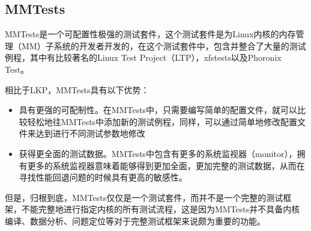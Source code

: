 \subsection{MMTests}

MMTests是一个可配置性极强的测试套件，这个测试套件是为Linux内核的内存管理（MM）子系统的开发者开发的，在这个测试套件中，包含并整合了大量的测试例程，其中有比较著名的Linux Test Project（LTP），xfstests以及Phoronix Test。

相比于LKP，MMTests具有以下优势：
\begin{itemize}
\item 具有更强的可配制性。在MMTests中，只需要编写简单的配置文件，就可以比较轻松地往MMTests中添加新的测试例程，同样，可以通过简单地修改配置文件来达到进行不同测试参数地修改
\item 获得更全面的测试数据。MMTests中包含有更多的系统监视器（monitor），拥有更多的系统监视器意味着能够得到更加全面，更加完整的测试数据，从而在寻找性能回退问题的时候具有更高的敏感性。
\end{itemize}

但是，归根到底，MMTests仅仅是一个测试套件，而并不是一个完整的测试框架，不能完整地进行指定内核的所有测试流程，这是因为MMTests并不具备内核编译、数据分析、问题定位等对于完整测试框架来说颇为重要的功能。




